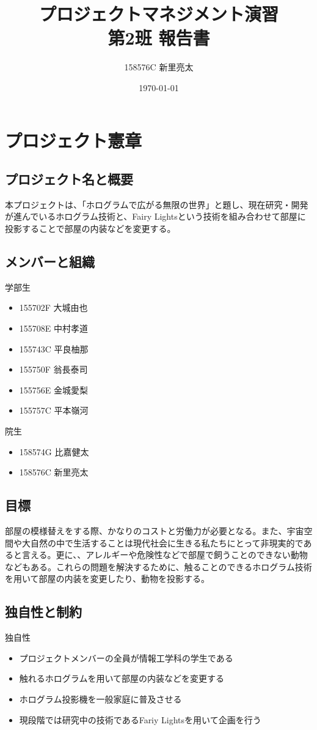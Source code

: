 \documentclass[11pt,a4paper]{jsarticle}
\title{\Huge{プロジェクトマネジメント演習\\第2班 報告書}}
\author{158576C 新里亮太}
\date{\today}
\begin{document}
\maketitle\thispagestyle{empty}
\newpage
\tableofcontents\thispagestyle{empty}
\newpage

\setcounter{page}{1}




\section{プロジェクト憲章}
\subsection{プロジェクト名と概要}
本プロジェクトは、「ホログラムで広がる無限の世界」と題し、現在研究・開発が進んでいるホログラム技術と、Fairy Lightsという技術を組み合わせて部屋に投影することで部屋の内装などを変更する。
\subsection{メンバーと組織}
学部生
\begin{itemize}
\item 155702F 大城由也
\item 155708E 中村孝道
\item 155743C 平良柚那
\item 155750F 翁長泰司
\item 155756E 金城愛梨
\item 155757C 平本嶺河
\end{itemize}

院生
\begin{itemize}
\item 158574G 比嘉健太
\item 158576C 新里亮太  
\end{itemize}


\subsection{目標}
部屋の模様替えをする際、かなりのコストと労働力が必要となる。また、宇宙空間や大自然の中で生活することは現代社会に生きる私たちにとって非現実的であると言える。更に、、アレルギーや危険性などで部屋で飼うことのできない動物などもある。これらの問題を解決するために、触ることのできるホログラム技術を用いて部屋の内装を変更したり、動物を投影する。

\subsection{独自性と制約}
独自性
\begin{itemize}
\item プロジェクトメンバーの全員が情報工学科の学生である
\item 触れるホログラムを用いて部屋の内装などを変更する
\item ホログラム投影機を一般家庭に普及させる
\item 現段階では研究中の技術であるFariy Lightsを用いて企画を行う
\end{itemize}
\end{document}

